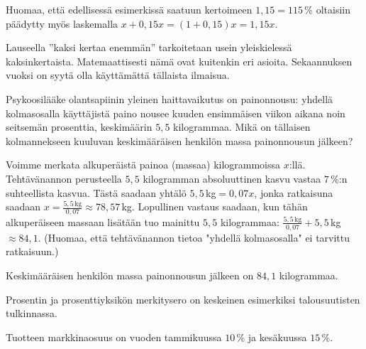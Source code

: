 Huomaa, että edellisessä esimerkissä saatuun kertoimeen $1,15 = 115\,\%$ oltaisiin päädytty myös laskemalla $x + 0,15x = (1 + 0,15)x = 1,15x$.

Lauseella ''kaksi kertaa enemmän'' tarkoitetaan usein yleiskielessä kaksinkertaista. Matemaattisesti nämä ovat kuitenkin eri asioita. Sekaannuksen vuoksi on syytä olla käyttämättä tällaista ilmaisua. %

\begin{esimerkki}
Psykoosilääke olantsapiinin yleinen haittavaikutus on painonnousu: yhdellä kolmasosalla käyttäjistä paino nousee kuuden ensimmäisen viikon aikana noin seitsemän prosenttia, keskimäärin $5,5$ kilogrammaa. Mikä on tällaisen kolmannekseen kuuluvan keskimääräisen henkilön massa painonnousun jälkeen?
	\begin{esimratk}
Voimme merkata alkuperäistä painoa (massaa) kilogrammoissa $x$:llä. Tehtävänannon perusteella $5,5$ kilogramman absoluuttinen kasvu vastaa $7$\,\%:n suhteellista kasvua. Tästä saadaan yhtälö $5,5\,$kg$=0,07x$, jonka ratkaisuna saadaan $x=\frac{5,5\,\textrm{kg}}{0,07}\approx78,57$\,kg. Lopullinen vastaus saadaan, kun tähän alkuperäiseen massaan lisätään tuo mainittu $5,5$ kilogrammaa: $\frac{5,5\,\textrm{kg}}{0,07}+5,5$\,kg$\approx84,1$. (Huomaa, että tehtävänannon tietoa "yhdellä kolmasosalla" ei tarvittu ratkaisuun.)
	\end{esimratk}
    \begin{esimvast}
    Keskimääräisen henkilön massa painonnousun jälkeen on $84,1$ kilogrammaa.
    \end{esimvast}
\end{esimerkki}


Prosentin ja prosenttiyksikön merkitysero on keskeinen esimerkiksi talousuutisten tulkinnassa.

\begin{esimerkki}
    Tuotteen markkinaosuus on vuoden tammikuussa $10$\,\% ja kesäkuussa $15$\,\%.

    \begin{esimratk}
    \end{esimratk}

\begin{esimvast}
\end{esimvast}
\end{esimerkki}
